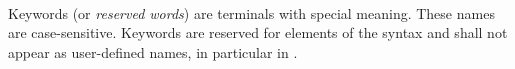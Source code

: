 
\begin{grammar}
\oneof \\
\end{grammar}

\specsubitem
Keywords (or \textit{reserved words}) are terminals with special meaning. These
names are case-sensitive. Keywords are reserved for elements of the syntax
and shall not appear as user-defined names, in particular in
.
